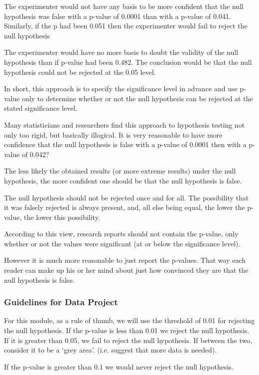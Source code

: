 The experimenter would not have any basis to be more confident that the null hypothesis was false with a p-value of 0.0001 than with a p-value of 0.041. Similarly, if the p had been 0.051 then the experimenter would fail to reject the null hypothesis

The experimenter would have no more basis to doubt the validity of the null hypothesis than if p-value had been 0.482. The conclusion would be that the null hypothesis could not be rejected at the 0.05 level.

In short, this approach is to specify the significance level in advance and use p-value only to determine whether or not the null hypothesis can be rejected at the stated significance level.

Many statisticians and researchers find this approach to hypothesis testing not only too rigid, but basically illogical. It is very reasonable to  have more confidence that the null hypothesis is false with a p-value of 0.0001 then with a p-value of 0.042?

The less likely the obtained results (or more extreme results) under the null hypothesis, the more confident one should be that the null hypothesis is false.

The null hypothesis should not be rejected once and for all. The possibility that it was falsely rejected is always present, and, all else being equal, the lower the p-value, the lower this possibility.

According to this view, research reports should not contain the p-value, only whether or not the values were significant (at or below the significance level).

However it is much more reasonable to just report the p-values. That way each reader can make up his or her mind about just how convinced they are that the null hypothesis is false.

\subsubsection{Guidelines for Data Project}
For this module, as a rule of thumb, we will use the threshold of 0.01 for rejecting the null hypothesis. If the p-value is less than 0.01 we reject the null hypothesis. If it is greater than 0.05, we fail to reject the null hypothesis. If between the two, consider it to be a `grey area'. (i.e. suggest that more data is needed).

If the p-value is greater than 0.1 we would never reject the null hypothesis.
 
